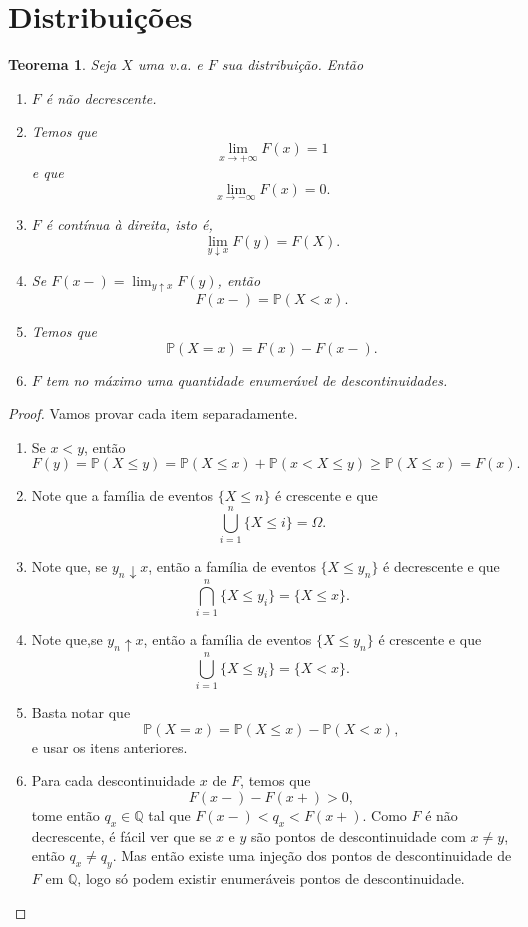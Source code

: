 \documentclass[12pt,a4paper,oneside]{book}
\newtheorem{theorem}{Teorema}[section]
\theoremstyle{definition}
\newtheorem{definition}[theorem]{Defini\c{c}\~ao}
\theoremstyle{remark}
\numberwithin{equation}{section}
\newcommand{\pr}{\mathbb{P}}
\begin{document}
\newpage


\section{Distribuições}\label{section- distribuicoes}





\begin{theorem} Seja $X$ uma v.a. e $F$ sua distribuição. Então
\begin{enumerate}
\item $F$ é não decrescente.
\item Temos que
$$\lim_{x\rightarrow +\infty} F(x) = 1$$ e que
$$\lim_{x\rightarrow -\infty} F(x) = 0.$$
\item $F$ é contínua à direita, isto é,
$$\lim_{y\downarrow x}F(y) = F(X). $$
\item Se $F(x-) = \lim_{y\uparrow x}F(y)$, então 
$$F(x-) = \pr(X<x). $$ 
\item Temos que
$$ \pr(X=x) = F(x)-F(x-).$$
\item $F$ tem no máximo uma quantidade enumerável de descontinuidades.
\end{enumerate}

\end{theorem}

\begin{proof}
Vamos provar cada item separadamente.
\begin{enumerate}
\item Se $x< y$, então
$$F(y)= \pr(X\leq y) = \pr(X\leq x) + \pr(x < X\leq y )\geq \pr(X\leq x)= F(x). $$
\item Note que  a família de eventos
$\{X\leq n\}$
é crescente e que 
$$\bigcup_{i=1}^n \{X\leq i\} = \Omega. $$
\item Note que, se $y_n\downarrow x$, então a família de eventos $\{X\leq y_n\}$ é decrescente e que 
$$\bigcap_{i=1}^n\{X\leq y_i\}= \{X\leq x\}. $$
\item Note que,se $y_n\uparrow x$, então a família de eventos $\{X\leq y_n\}$ é crescente e que 
$$\bigcup_{i=1}^n\{X\leq y_i\}= \{X< x\}. $$ 
\item Basta notar que
$$\pr(X=x) = \pr(X\leq x)- \pr(X<x), $$
e usar os itens anteriores.
\item Para cada descontinuidade $x$ de $F$, temos que
$$F(x-)-F(x+)>0, $$
tome então $q_x\in \mathbb{Q}$ tal que  $F(x-)<q_x<F(x+)$. Como $F$ é não decrescente, é fácil ver que se $x$ e $y$ são pontos de descontinuidade com $x\neq y$, então $q_x\neq q_y$. Mas então existe uma injeção dos pontos de descontinuidade de $F$ em $\mathbb{Q}$, logo só podem existir enumeráveis pontos de descontinuidade.
\end{enumerate}
\end{proof}
\end{document}
